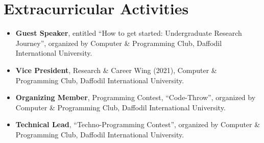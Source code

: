 \section{\textbf{Extracurricular Activities}}
\begin{itemize}[leftmargin=*,itemsep=2pt,parsep=0pt]
    \item \textbf{Guest Speaker}, entitled “How to get started: Undergraduate Research Journey”, organized by Computer \& Programming Club, Daffodil International University.
    \item \textbf{Vice President}, Research \& Career Wing (2021), Computer \& Programming Club, Daffodil International University.
    \item \textbf{Organizing Member}, Programming Contest, “Code-Throw”, organized by Computer \& Programming Club, Daffodil International University.
    \item \textbf{Technical Lead}, “Techno-Programming Contest”, organized by Computer \& Programming Club, Daffodil International University.
\end{itemize}
